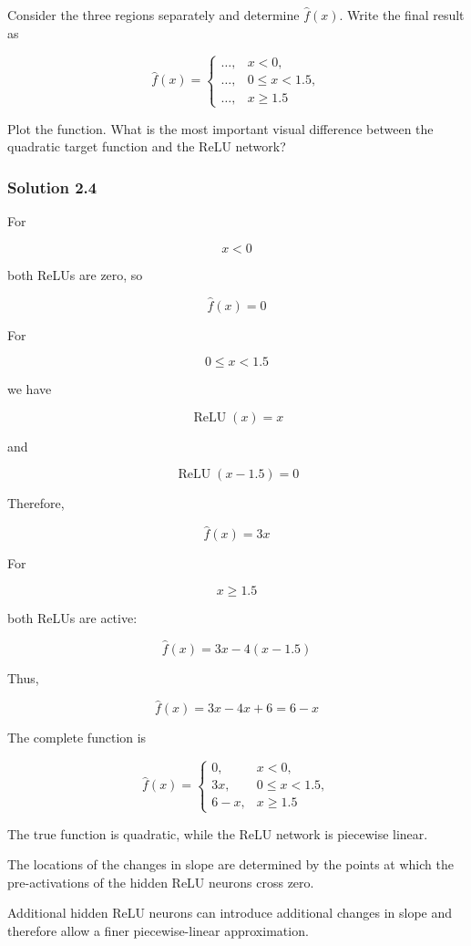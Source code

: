 \documentclass[10pt]{article}
\begin{document}
Consider the three regions separately and determine $\hat f(x)$. Write the final result as

\[
\hat f(x)=
\begin{cases}
\ldots, & x<0,\\
\ldots, & 0\leq x<1.5,\\
\ldots, & x\geq1.5
\end{cases}
\]

Plot the function. What is the most important visual difference between the quadratic target function and the ReLU network?

\begingroup\color{red}

\subsubsection*{Solution 2.4}
For

\[
x<0
\]

both ReLUs are zero, so

\[
\hat f(x)=0
\]

For

\[
0\leq x<1.5
\]

we have

\[
\operatorname{ReLU}(x)=x
\]

and

\[
\operatorname{ReLU}(x-1.5)=0
\]

Therefore,

\[
\hat f(x)=3x
\]

For

\[
x\geq1.5
\]

both ReLUs are active:

\[
\hat f(x)=3x-4(x-1.5)
\]

Thus,

\[
\hat f(x)=3x-4x+6=6-x
\]

The complete function is

\[
\hat f(x)=
\begin{cases}
0, & x<0,\\
3x, & 0\leq x<1.5,\\
6-x, & x\geq1.5
\end{cases}
\]

The true function is quadratic, while the ReLU network is piecewise linear.

The locations of the changes in slope are determined by the points at which the pre-activations of the hidden ReLU neurons cross zero.

Additional hidden ReLU neurons can introduce additional changes in slope and therefore allow a finer piecewise-linear approximation.
\end{document}
